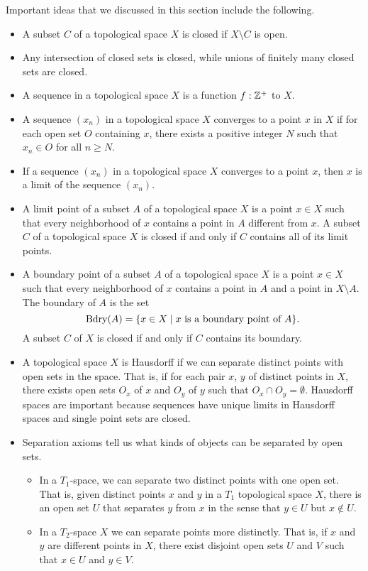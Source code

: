 Important ideas that we discussed in this section include the following.
\begin{itemize}
\item A subset $C$ of a topological space $X$ is closed if $X \setminus C$ is open.
\item Any intersection of closed sets is closed, while unions of finitely many closed sets are closed. 
\item A sequence in a topological space $X$ is a function $f: \mathbb{Z}^+$ to $X$.
\item A sequence $(x_n)$ in a topological space $X$ converges to a point $x$ in $X$ if for each open set $O$ containing $x$, there exists a positive integer $N$ such that $x_n \in O$ for all $n \geq N$. 
\item If a sequence $(x_n)$ in a topological space $X$ converges to a point $x$, then $x$ is a limit of the sequence $(x_n)$. 
\item A limit point of a subset $A$ of a topological space $X$ is a point $x \in X$ such that every neighborhood of $x$ contains a point in $A$ different from $x$. A subset $C$ of a topological space $X$ is closed if and only if $C$ contains all of its limit points.   
\item A boundary point of a subset $A$ of a topological space $X$ is a point $x \in X$ such that every neighborhood of $x$ contains a point in $A$ and a point in $X \setminus A$. The boundary of $A$ is the set 
\[\text{Bdry}(A) = \{x \in X \mid x \text{ is a boundary point of } A\}.\]
A subset $C$ of $X$ is closed if and only if $C$ contains its boundary. 
\item A topological space $X$ is Hausdorff if we can separate distinct points with open sets in the space. That is, if for each pair $x$, $y$ of distinct points in $X$, there exists open sets $O_x$ of $x$ and $O_y$ of $y$ such that $O_x \cap O_y = \emptyset$. 
Hausdorff spaces are important because sequences have unique limits in Hausdorff spaces and single point sets are closed. 
\item Separation axioms tell us what kinds of objects can be separated by open sets. 
	\begin{itemize}
	\item In a $T_1$-space, we can separate two distinct points with one open set. That is, given distinct points $x$ and $y$ in a $T_1$ topological space $X$, there is an open set $U$ that separates $y$ from $x$ in the sense that $y \in U$ but $x \notin U$. 
	\item In a $T_2$-space $X$ we can separate points more distinctly. That is, if $x$ and $y$ are different points in $X$, there exist disjoint open sets $U$ and $V$ such that $x \in U$ and $y \in V$. 

\end{itemize}
\end{itemize}
